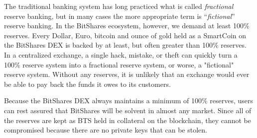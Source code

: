 The traditional banking system has long practiced what is called
\emph{fractional} reserve banking, but in many cases the more appropriate term
is ``\emph{fictional}'' reserve banking. In the BitShares ecosystem, however,
we demand at least 100\% reserves. Every Dollar, Euro, bitcoin and ounce of
gold held as a SmartCoin on the BitShares DEX is backed by at least, but often
greater than 100\% reserves.  In a centralized exchange, a single hack,
mistake, or theft can quickly turn a 100\% reserve system into a fractional
reserve system, or worse, a "fictional" reserve system. Without any reserves,
it is unlikely that an exchange would ever be able to pay back the funds it
owes to its customers.

Because the BitShares DEX always maintains a minimum of 100\% reserves, users
can rest assured that BitShares will be solvent in almost any market. Since all
of the reserves are kept as BTS held in collateral on the blockchain, they
cannot be compromised because there are no private keys that can be stolen.
